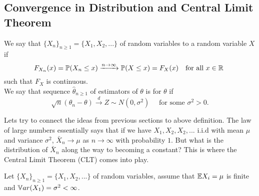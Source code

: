 \subsection{Convergence in Distribution and Central Limit Theorem}
\begin{definition} 
    We say that $\{ X_n \}_{n \geq 1}  = \{ X_1,X_2,... \}$ of random variables  to a random variable $X$ if 
    $$
    F_{X_n}(x) = \mathbb P(X_n \leq x) \xrightarrow{n \to \infty} \mathbb P(X \leq x) = F_{X}(x) \quad \text{for all } x \in \mathbb R \
    $$
    such that $F_X$ is continuous.\\
    We say that sequence $\hat{\theta}_{n \geq 1}$ of estimators of $\theta$ is  for $\theta$ if 
    $$
    \sqrt{n}(\theta_n - \theta) \xrightarrow{d} Z \sim N(0,\sigma^2) \quad \text{ for some } \sigma^2 >0.
    $$
\end{definition}
Lets try to connect the ideas from previous sections to above definition. The law of large numbers essentially says that if we have $X_1,X_2,X_2,...$ i.i.d with mean $\mu$ and variance $\sigma^2$, $\bar{X}_n \to \mu$ as $n \to \infty$ with probability $1$. But what is the distribution of $\bar{X}_n$ along the way to becoming a constant? This is where the Central Limit Theorem (CLT) comes into play. 
\begin{theorem}
    Let $\{ X_n \}_{n \geq 1}  = \{ X_1,X_2,... \}$ of random variables, assume that $\mathbb E X_i = \mu$ is finite and $\mathbb V ar(X_1) = \sigma^2 < \infty$.
    
    
\end{theorem}